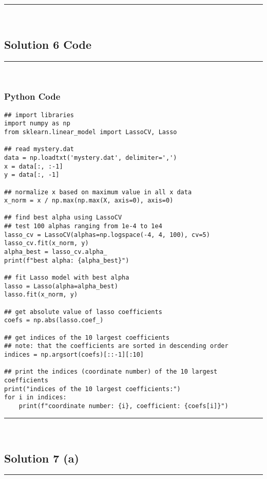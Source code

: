 \documentclass{article}
\begin{document}
\noindent\rule{\textwidth}{0.4pt}\\

\newpage

\subsection*{Solution 6 Code}
\noindent\rule{\textwidth}{0.4pt}\\

\subsubsection*{Python Code}

\begin{lstlisting}
## import libraries
import numpy as np
from sklearn.linear_model import LassoCV, Lasso

## read mystery.dat
data = np.loadtxt('mystery.dat', delimiter=',')
x = data[:, :-1]
y = data[:, -1]

## normalize x based on maximum value in all x data
x_norm = x / np.max(np.max(X, axis=0), axis=0)

## find best alpha using LassoCV
## test 100 alphas ranging from 1e-4 to 1e4
lasso_cv = LassoCV(alphas=np.logspace(-4, 4, 100), cv=5)
lasso_cv.fit(x_norm, y)
alpha_best = lasso_cv.alpha_
print(f"best alpha: {alpha_best}")

## fit Lasso model with best alpha
lasso = Lasso(alpha=alpha_best)
lasso.fit(x_norm, y)

## get absolute value of lasso coefficients
coefs = np.abs(lasso.coef_)

## get indices of the 10 largest coefficients
## note: that the coefficients are sorted in descending order
indices = np.argsort(coefs)[::-1][:10]

## print the indices (coordinate number) of the 10 largest coefficients
print("indices of the 10 largest coefficients:")
for i in indices:
    print(f"coordinate number: {i}, coefficient: {coefs[i]}")

\end{lstlisting}


\noindent\rule{\textwidth}{0.4pt}\\

\newpage

\subsection*{Solution 7 (a)}
\noindent\rule{\textwidth}{0.4pt}\\
\end{document}
